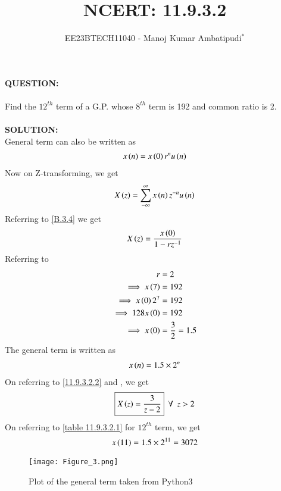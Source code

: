 \documentclass[journal,12pt,twocolumn]{IEEEtran}
\theoremstyle{remark}
\begin{document}

\vspace{3cm}
\title{NCERT: 11.9.3.2}
\author{EE23BTECH11040 - Manoj Kumar Ambatipudi$^{*}$%
}
\maketitle
\newpage
\bigskip
\renewcommand{\thefigure}{\theenumi}
\renewcommand{\thetable}{\theenumi}
\textbf{QUESTION:}\\\\
Find the $12^{th}$ term of a G.P. whose $8^{th}$ term is 192 and common ratio is 2.\\\\
\textbf{SOLUTION:}\\
General term can also be written as 
\begin{align}
    x\left(n\right)=x\left(0\right)r^{n}u\left(n\right)\label{11.9.3.2.1}
\end{align}
Now on Z-transforming, we get
\begin{align}
    X\left(z\right)=\sum_{-\infty}^{\infty}x\left(n\right)z^{-n}u\left(n\right)
\end{align}      
Referring to \eqref{B.3.4} we get
\begin{align}
    X\left(z\right)=\dfrac{x\left(0\right)}{1-rz^{-1}}\label{11.9.3.2.2}
\end{align}
Referring to 
\begin{align}
                     r&=2\\
\implies     x\left(7\right)&=192\\
\implies x\left(0\right)2^{7}&=192\\
\implies 128x\left(0\right)&=192\\
\implies x\left(0\right)&=\dfrac{3}{2}=1.5
\end{align}
The general term is written as
\begin{align}
    x\left(n\right)=1.5\times2^{n}
\end{align}
On referring to \eqref{11.9.3.2.2} and , we get
\begin{align}
   \boxed{X\left(z\right)=\dfrac{3}{z-2}}\,\,\, \forall \,\,\, z>2
\end{align}
On referring to \ref{table 11.9.3.2.1} for $12^{th}$ term, we get
\begin{align}
x\left(11\right) = 1.5\times2^{11} = 3072
\end{align}
\begin{figure}[h]
\renewcommand\thefigure{1} 
    \centering
    \texttt{[image: Figure\_3.png]}
    \caption{Plot of the general term taken from Python3}
    \label{fig:1}
\end{figure}\\
\end{document}
